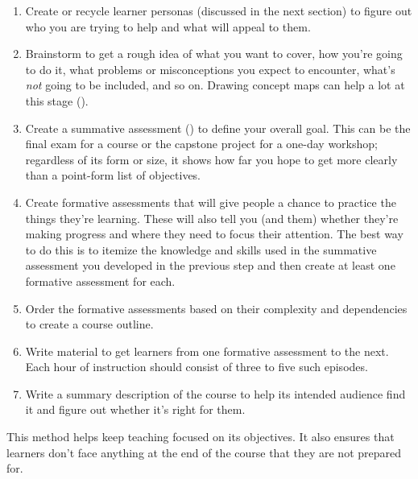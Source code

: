 \begin{enumerate}

\item
  Create or recycle learner personas (discussed in the next section)
  to figure out who you are trying to help and what will appeal to them.

\item
  Brainstorm to get a rough idea of what you want to cover,
  how you're going to do it,
  what problems or misconceptions you expect to encounter,
  what's \emph{not} going to be included,
  and so on.
  Drawing concept maps can help a lot at this stage ().

\item
  Create a summative assessment ()
  to define your overall goal.
  This can be the final exam for a course
  or the capstone project for a one-day workshop;
  regardless of its form or size,
  it shows how far you hope to get
  more clearly than a point-form list of objectives.

\item
  Create formative assessments
  that will give people a chance to practice the things they're learning.
  These will also tell you (and them) whether they're making progress
  and where they need to focus their attention.
  The best way to do this is to itemize the knowledge and skills used in
  the summative assessment you developed in the previous step
  and then create at least one formative assessment for each.

\item
  Order the formative assessments
  based on their complexity and dependencies
  to create a course outline.

\item
  Write material to get learners from one formative assessment to the next.
  Each hour of instruction should consist of three to five such episodes.

\item
  Write a summary description of the course
  to help its intended audience find it
  and figure out whether it's right for them.

\end{enumerate}

This method helps keep teaching focused on its objectives.
It also ensures that learners don't face anything at the end of the course
that they are not prepared for.

